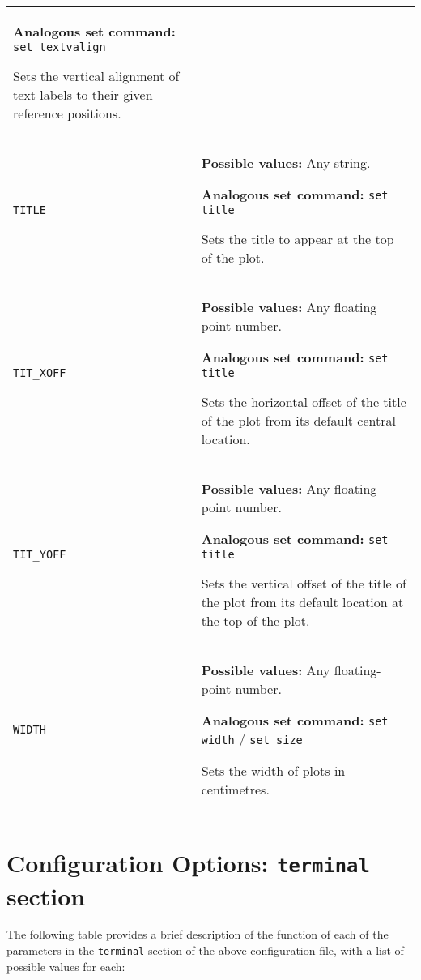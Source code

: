 \documentclass[a4paper,onecolumn,11pt]{book}
\begin{document}
\begin{longtable}{p{3.4cm}p{9cm}}
                   \textbf{Analogous set command:} \texttt{set textvalign}\index{set textvalign command@\texttt{set textvalign} command}

                   Sets the vertical alignment of text labels to their given reference positions.
                   \\
\texttt{TITLE} & \textbf{Possible values:} Any string.

                   \textbf{Analogous set command:} \texttt{set title}\index{set title command@\texttt{set title} command}

                   Sets the title to appear at the top of the plot.
                   \\
\texttt{TIT\_XOFF} & \textbf{Possible values:} Any floating point number.

                   \textbf{Analogous set command:} \texttt{set title}

                   Sets the horizontal offset of the title of the plot from its default central location.
                   \\
\texttt{TIT\_YOFF} & \textbf{Possible values:} Any floating point number.

                   \textbf{Analogous set command:} \texttt{set title}

                   Sets the vertical offset of the title of the plot from its default location at the top of the plot.
                   \\
\texttt{WIDTH} & \textbf{Possible values:} Any floating-point number.

                   \textbf{Analogous set command:} \texttt{set width} / \texttt{set size}\index{set width command@\texttt{set width} command}\index{set size command@\texttt{set size} command}

                   Sets the width of plots in centimetres.
                   \\
\end{longtable}

\section{Configuration Options: \texttt{terminal} section}
\label{configfile_terminal}

The following table provides a brief description of the function of each of the
parameters in the \texttt{terminal} section of the above configuration file,
with a list of possible values for each:
\end{document}
